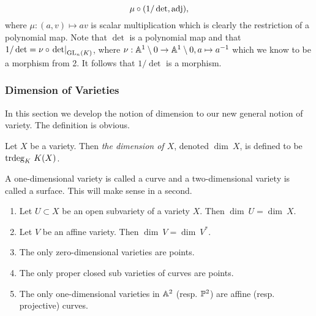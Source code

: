 \begin{example}
\begin{enumerate}
                $$\mu\circ (1/\det,\mathrm{adj}),$$
                where $\mu: (a,v)\mapsto av$ is scalar multiplication which is clearly the restriction of a polynomial map. Note that $\det$ is a polynomial map and that $1/\det=\nu\circ \left.\det\right|_{\mathrm{GL}_n(K)}$, where $\nu: \mathbb{A}^1\setminus 0 \rightarrow \mathbb{A}^1\setminus 0, a\mapsto a^{-1}$ which we know to be a morphism from 2. It follows that $1/\det$ is a morphism. 
            \end{enumerate}
        \end{example}
    \subsubsection{Dimension of Varieties}
        In this section we develop the notion of dimension to our new general notion of variety. The definition is obvious. 
        \begin{definition}
            Let $X$ be a variety. Then \textit{the dimension of $X$}, denoted $\dim\ X$, is defined to be $\mathrm{trdeg }_K \ K(X)$.
        \end{definition}
        \begin{remark}
            A one-dimensional variety is called a curve and a two-dimensional variety is called a surface. This will make sense in a second.
        \end{remark}
        \begin{lemma}\label{SomeDimensionResults}
            \begin{enumerate}
                \item Let $U\subset X$ be an open subvariety of a variety $X$. Then $\dim \ U = \dim \ X$.
                \item Let $V$ be an affine variety. Then $\dim\ V = \dim \ V^\ast$.
                \item The only zero-dimensional varieties are points.
                \item The only proper closed sub varieties of curves are points.
                \item The only one-dimensional varieties in $\mathbb{A}^2$ (resp. $\mathbb{P}^2$) are affine (resp. projective) curves. 
            \end{enumerate}
        \end{lemma}
